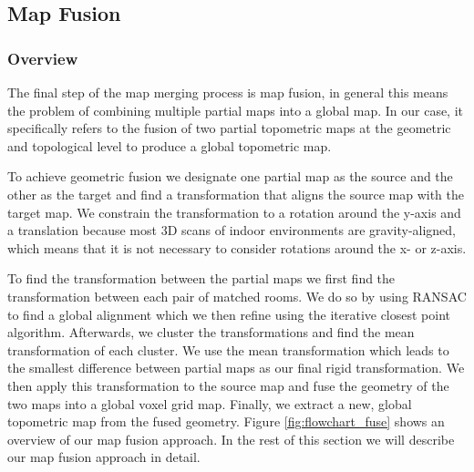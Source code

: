 \subsection{Map Fusion}

\subsubsection{Overview}
The final step of the map merging process is map fusion, in general this means the problem of combining multiple partial maps into a global map. In our case, it specifically refers to the fusion of two partial topometric maps at the geometric and topological level to produce a global topometric map. 

To achieve geometric fusion we designate one partial map as the source and the other as the target and find a transformation that aligns the source map with the target map. We constrain the transformation to a rotation around the y-axis and a translation because most 3D scans of indoor environments are gravity-aligned, which means that it is not necessary to consider rotations around the x- or z-axis. 

To find the transformation between the partial maps we first find the transformation between each pair of matched rooms. We do so by using RANSAC to find a global alignment which we then refine using the iterative closest point algorithm. Afterwards, we cluster the transformations and find the mean transformation of each cluster. We use the mean transformation which leads to the smallest difference between partial maps as our final rigid transformation. We then apply this transformation to the source map and fuse the geometry of the two maps into a global voxel grid map. Finally, we extract a new, global topometric map from the fused geometry. Figure \ref{fig:flowchart_fuse} shows an overview of our map fusion approach. In the rest of this section we will describe our map fusion approach in detail.

